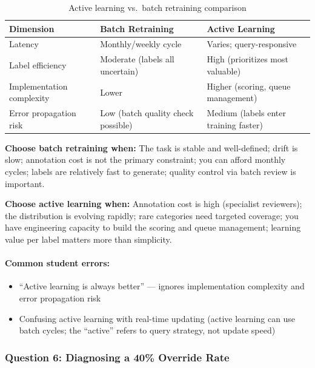 \begin{table}[htbp]
\caption{Active learning vs.\ batch retraining comparison}
\label{tab:al-vs-batch}
\centering
\begin{tabular}{@{}p{3.5cm}p{4cm}p{4cm}@{}}
\toprule
\textbf{Dimension} & \textbf{Batch Retraining} & \textbf{Active Learning} \\
\midrule
Latency & Monthly/weekly cycle & Varies; query-responsive \\
Label efficiency & Moderate (labels all uncertain) & High (prioritizes most valuable) \\
Implementation complexity & Lower & Higher (scoring, queue management) \\
Error propagation risk & Low (batch quality check possible) & Medium (labels enter training faster) \\
\bottomrule
\end{tabular}
\end{table}

\textbf{Choose batch retraining when:} The task is stable and well-defined; drift is slow; annotation cost is not the primary constraint; you can afford monthly cycles; labels are relatively fast to generate; quality control via batch review is important.

\textbf{Choose active learning when:} Annotation cost is high (specialist reviewers); the distribution is evolving rapidly; rare categories need targeted coverage; you have engineering capacity to build the scoring and queue management; learning value per label matters more than simplicity.

\paragraph{Common student errors:}
\begin{itemize}
    \item ``Active learning is always better'' --- ignores implementation complexity and error propagation risk
    \item Confusing active learning with real-time updating (active learning can use batch cycles; the ``active'' refers to query strategy, not update speed)
\end{itemize}

\subsubsection{Question 6: Diagnosing a 40\% Override Rate}


